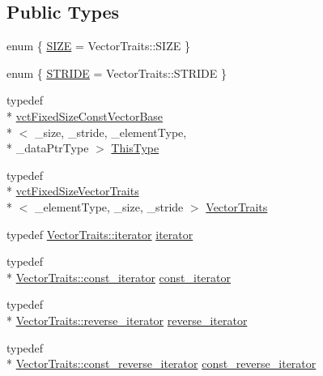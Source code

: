 \subsection*{Public Types}
\begin{DoxyCompactItemize}
\item 
enum \{ \hyperlink{classvct_fixed_size_const_vector_base_abce8a0d5a26d7343df60ea28ccf38626ac440f88d775ff77d03e1a484a213dcfe}{S\-I\-Z\-E} = Vector\-Traits\-:\-:S\-I\-Z\-E
 \}
\item 
enum \{ \hyperlink{classvct_fixed_size_const_vector_base_a8b833ecc64bf9196c1a89a56d6f11ebbaddc2fa94f972a3bf4df3a35bec4bdc48}{S\-T\-R\-I\-D\-E} = Vector\-Traits\-:\-:S\-T\-R\-I\-D\-E
 \}
\item 
typedef \\*
\hyperlink{classvct_fixed_size_const_vector_base}{vct\-Fixed\-Size\-Const\-Vector\-Base}\\*
$<$ \-\_\-size, \-\_\-stride, \-\_\-element\-Type, \\*
\-\_\-data\-Ptr\-Type $>$ \hyperlink{classvct_fixed_size_const_vector_base_a071063bc4fa43112cc287b2dbef53180}{This\-Type}
\item 
typedef \\*
\hyperlink{classvct_fixed_size_vector_traits}{vct\-Fixed\-Size\-Vector\-Traits}\\*
$<$ \-\_\-element\-Type, \-\_\-size, \-\_\-stride $>$ \hyperlink{classvct_fixed_size_const_vector_base_ac47f6db624303dee621bca2ec51aa75e}{Vector\-Traits}
\item 
typedef \hyperlink{classvct_fixed_size_vector_traits_a4c4cff693ac7f81edfb240a208506309}{Vector\-Traits\-::iterator} \hyperlink{classvct_fixed_size_const_vector_base_ad0ba9b13bb2515695b4e44290bdbaa5d}{iterator}
\item 
typedef \\*
\hyperlink{classvct_fixed_size_vector_traits_a9c7e38590e4a27350095e89a84dc0d09}{Vector\-Traits\-::const\-\_\-iterator} \hyperlink{classvct_fixed_size_const_vector_base_abc547e0542bb6f7d92876a56c7ea5cdc}{const\-\_\-iterator}
\item 
typedef \\*
\hyperlink{classvct_fixed_size_vector_traits_a46a61657ee7bece7277e0b59c4e0ea41}{Vector\-Traits\-::reverse\-\_\-iterator} \hyperlink{classvct_fixed_size_const_vector_base_ae22e8ced509e202d00620f384ac3a5b2}{reverse\-\_\-iterator}
\item 
typedef \\*
\hyperlink{classvct_fixed_size_vector_traits_a66365350e5fae26c9cf29a3ce0bb4a60}{Vector\-Traits\-::const\-\_\-reverse\-\_\-iterator} \hyperlink{classvct_fixed_size_const_vector_base_acd0a5fe64ff3551c45cebfb2ba81cf10}{const\-\_\-reverse\-\_\-iterator}

\end{DoxyCompactItemize}
